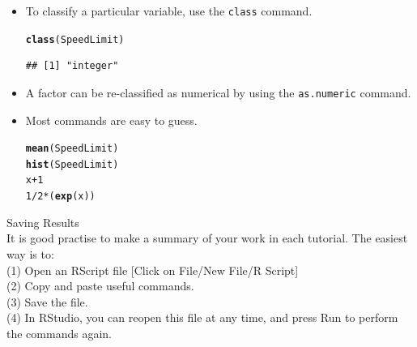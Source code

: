 \documentclass[bigtut]{tutorial}\usepackage[]{graphicx}\usepackage[]{color}
\makeatletter
\newcommand{\hlnum}[1]{\textcolor[rgb]{0.686,0.059,0.569}{#1}}%
\newcommand{\hlopt}[1]{\textcolor[rgb]{0,0,0}{#1}}%
\newcommand{\hlstd}[1]{\textcolor[rgb]{0.345,0.345,0.345}{#1}}%
\newcommand{\hlkwd}[1]{\textcolor[rgb]{0.737,0.353,0.396}{\textbf{#1}}}%
\newenvironment{kframe}{%
 \def\at@end@of@kframe{}%
 \ifinner\ifhmode%
  \def\at@end@of@kframe{\end{minipage}}%
  \begin{minipage}{\columnwidth}%
 \fi\fi%
 \def\FrameCommand##1{\hskip\@totalleftmargin \hskip-\fboxsep
 \colorbox{shadecolor}{##1}\hskip-\fboxsep
     \hskip-\linewidth \hskip-\@totalleftmargin \hskip\columnwidth}%
 \MakeFramed {\advance\hsize-\width
   \@totalleftmargin\z@ \linewidth\hsize
   \@setminipage}}%
 {\par\unskip\endMakeFramed%
 \at@end@of@kframe}
\newenvironment{knitrout}{}{} %
\makeatother
\begin{document}
\begin{tutorial}
\begin{questions}
\begin{itemize}
\vspace{.5cm}
\item
To classify a particular variable, use the \texttt{class} command.
\begin{knitrout}
\color{fgcolor}\begin{kframe}
\begin{alltt}
\hlkwd{class}\hlstd{(SpeedLimit)}
\end{alltt}
\begin{verbatim}
## [1] "integer"
\end{verbatim}
\end{kframe}
\end{knitrout}

\vspace{.5cm}
\item
A factor can be re-classified as numerical by using the \texttt{as.numeric} command.

\vspace{.5cm}
\item
Most commands are easy to guess.
\begin{knitrout}
\color{fgcolor}\begin{kframe}
\begin{alltt}
\hlkwd{mean}\hlstd{(SpeedLimit)}
\hlkwd{hist}\hlstd{(SpeedLimit)}
\hlstd{x}\hlopt{+}\hlnum{1}
\hlnum{1}\hlopt{/}\hlnum{2}\hlopt{*}\hlstd{(}\hlkwd{exp}\hlstd{(x))}
\end{alltt}
\end{kframe}
\end{knitrout}


\end{itemize}

\question Saving Results \\

It is good practise to make a summary of your work in each tutorial. The easiest way is to: \\
(1) Open an RScript file [Click on \textsf{File/New File/R Script}] \\
(2) Copy and paste useful commands. \\
(3) Save the file. \\
(4) In RStudio, you can reopen this file at any time, and press \textsf{Run} to perform the commands again. \\

\end{questions}
\end{tutorial}
\end{document}
